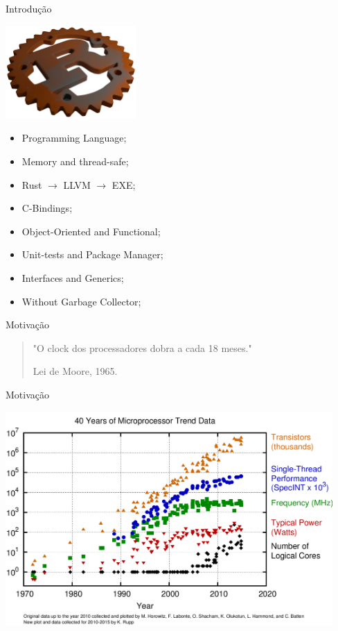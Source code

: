 \documentclass[aspectratio=169]{beamer}
\begin{document}
\begin{frame}{Introdução}
	\begin{multicols}{2}		
		\begin{center}
			\includegraphics[width=5cm]{imgs/rust3d.png}
		\end{center}
		\footnotesize
		\begin{itemize}
			\item Programming Language;
			\item Memory and thread-safe;
			\item Rust $\rightarrow$ LLVM $\rightarrow$ EXE;
			\item C-Bindings;
			\item Object-Oriented and Functional;
			\item Unit-tests and Package Manager;
			\item Interfaces and Generics;
			\item Without Garbage Collector;
		\end{itemize}	
	\end{multicols}
\end{frame}

\begin{frame}{Motivação}
	\begin{quote}
		\hspace{0.5cm}"O clock dos processadores dobra a cada 18 meses."
		
		\hspace{8.2cm}Lei de Moore, 1965.
	\end{quote}
\end{frame}

\begin{frame}{Motivação}
	\begin{center}
		\includegraphics[width=12.5cm]{imgs/cores-history.png}
	\end{center}
\end{frame}
\end{document}
